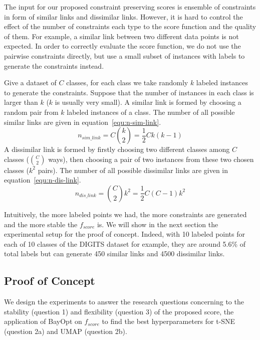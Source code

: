 The input for our proposed constraint preserving scores is ensemble of constraints in form of similar links and dissimilar links.
However, it is hard to control the effect of the number of constraints each type to the score function and the quality of them.
For example, a similar link between two different data points is not expected.
In order to correctly evaluate the score function, we do not use the pairwise constraints directly, but use a small subset of instances with labels to generate the constraints instead.

Give a dataset of $C$ classes, for each class we take randomly $k$ labeled instances to generate the constraints.
Suppose that the number of instances in each class is larger than $k$ ($k$ is usually very small).
A similar link is formed by choosing a random pair from $k$ labeled instances of a class.
The number of all possible similar links are given in equation~\ref{equ:n-sim-link}.
\begin{equation}\label{equ:n-sim-link}
n_{sim\_link} = C {k \choose 2} = \frac{1}{2} C k (k-1)
\end{equation}
A dissimilar link is formed by firstly choosing two different classes among $C$ classes (${C \choose 2}$ ways),
then choosing a pair of two instances from these two chosen classes ($k^2$ pairs).
The number of all possible dissimilar links are given in equation~\ref{equ:n-dis-link}.
\begin{equation}\label{equ:n-dis-link}
n_{dis\_link} = {C \choose 2} k^2 = \frac{1}{2} C (C-1) k^2
\end{equation}

Intuitively, the more labeled points we had, the more constraints are generated and the more stable the $f_{score}$ is.
We will show in the next section the experimental setup for the proof of concept.
Indeed, with 10 labeled points for each of 10 classes of the DIGITS dataset for example, they are around 5.6\% of total labels but can generate 450 similar links and 4500 dissimilar links.


\subsection{Proof of Concept}
We design the experiments to answer the research questions concerning to the stability (question 1) and flexibility (question 3) of the proposed score, the application of BayOpt on $f_{score}$ to find the best hyperparameters for t-SNE (question 2a) and UMAP (question 2b).

